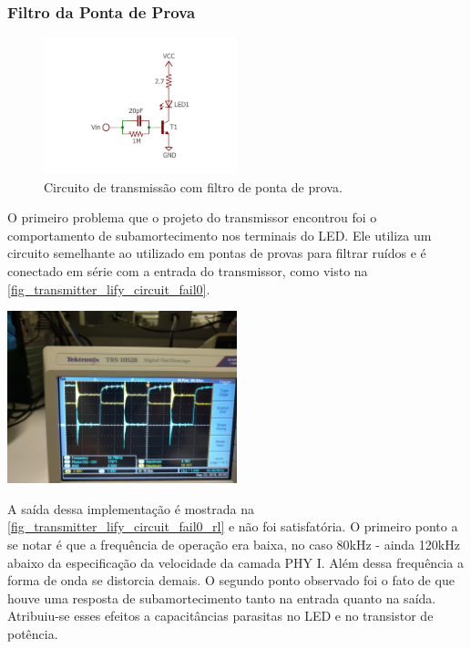 	\subsubsection{Filtro da Ponta de Prova}
	\begin{figure}[htb]
		\caption{\label{fig_transmitter_lify_circuit_fail0}Circuito de transmissão com filtro de ponta de prova.}
		\centering		%
		\includegraphics[width=0.5\textwidth, trim={2cm 1cm 2cm 2cm}, clip]{circuits/transmitter_fail0.pdf}
	\end{figure}
	O primeiro problema que o projeto do transmissor encontrou foi o comportamento de subamortecimento nos terminais do LED. Ele utiliza um circuito semelhante ao utilizado em pontas de provas para filtrar ruídos e é conectado em série com a entrada do transmissor, como visto na \autoref{fig_transmitter_lify_circuit_fail0}.
	\begin{chart}[htb]
		\caption{\label{fig_transmitter_lify_circuit_fail0_rl}Comportamento do circuito de transmissão com filtro de ponta de prova em série com a entrada. A onda azul é saída do gerador de funções enquanto a onda amarela é a tensão submetida ao LED. Observa-se o comportamento de subamortecimento em ambas.}
		\centering		%
		\includegraphics[width=0.5\textwidth, trim={30cm 0cm 2cm 40cm}, clip]{circuits/photos/TX_probe_result.jpg}
	\end{chart}

	A saída dessa implementação é mostrada na \autoref{fig_transmitter_lify_circuit_fail0_rl} e não foi satisfatória. O primeiro ponto a se notar é que a frequência de operação era baixa, no caso 80kHz - ainda 120kHz abaixo da especificação da velocidade da camada PHY I. Além dessa frequência a forma de onda se distorcia demais. O segundo ponto observado foi o fato de que houve uma resposta de subamortecimento tanto na entrada quanto na saída. Atribuiu-se esses efeitos a capacitâncias parasitas no LED e no transistor de potência.
	
